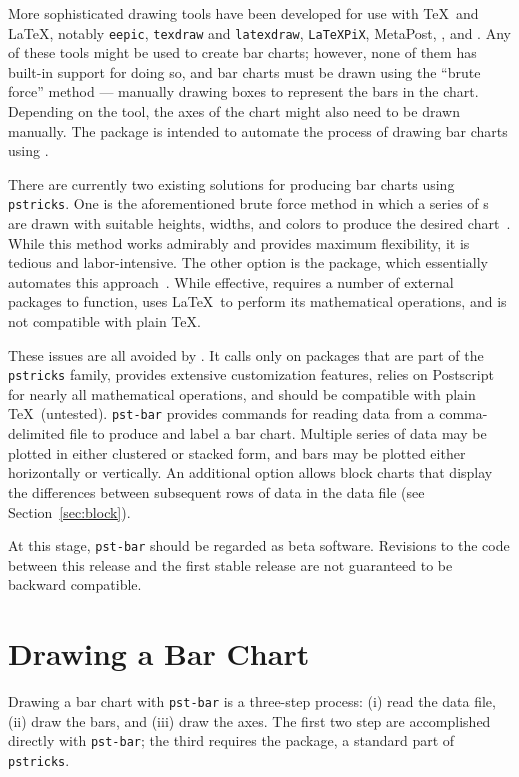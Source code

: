 \documentclass[11pt,english,BCOR=10mm,DIV=14,bibliography=totoc,parskip=false,headings=small,
    headinclude=false,footinclude=false,twoside]{pst-doc}
\begin{document}
    More sophisticated drawing tools have been developed for use with \TeX\ and
    \LaTeX, notably \verb|eepic|, \verb|texdraw| and \verb|latexdraw|,
    \verb|LaTeXPiX|, MetaPost, , and . Any of these
    tools might be used to create bar charts; however, none of them has
    built-in support for doing so, and bar charts must be drawn using the
    ``brute force'' method --- manually drawing boxes to represent the bars in
    the chart. Depending on the tool, the axes of the chart might also need to
    be drawn manually. The  package is intended to automate the
    process of drawing bar charts using .

    There are currently two existing solutions for producing bar charts using
    \verb|pstricks|. One is the aforementioned brute force method in which a
    series of s are drawn with suitable heights, widths, and
    colors to produce the desired chart~\cite{PSTricksE}. While this
    method works admirably and provides maximum flexibility, it is tedious and
    labor-intensive. The other option is the  package, which
    essentially automates this approach~\cite{bardiag}. While effective,
     requires a number of external packages to function, uses
    \LaTeX\ to perform its mathematical operations, and is not compatible with
    plain \TeX.

    These issues are all avoided by . It calls only on packages
    that are part of the \verb|pstricks| family, provides extensive
    customization features, relies on Postscript for nearly all mathematical
    operations, and should be compatible with plain \TeX\ (untested).
    \verb|pst-bar| provides commands for reading data from a comma-delimited
    file to produce and label a bar chart. Multiple series of data may be
    plotted in either clustered or stacked form, and bars may be plotted either
    horizontally or vertically. An additional option allows block charts that
    display the differences between subsequent rows of data in the data file
    (see Section~\ref{sec:block}).

    At this stage, \verb|pst-bar| should be regarded as beta software.
    Revisions to the code between this release and the first stable release are
    not guaranteed to be backward compatible.

  \section{Drawing a Bar Chart}
    Drawing a bar chart with \verb|pst-bar| is a three-step process: (i) read
    the data file, (ii) draw the bars, and (iii) draw the axes. The first two
    step are accomplished directly with \verb|pst-bar|; the third requires the
     package, a standard part of \verb|pstricks|.
\end{document}
